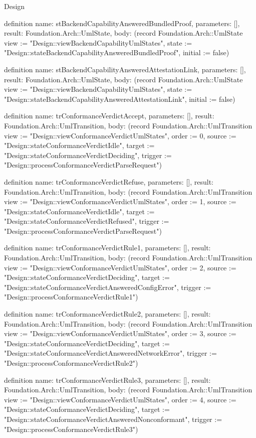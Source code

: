 \begin{lexlean}{Design}
\begin{semanticmodule}
definition{
  name: stBackendCapabilityAnsweredBundledProof,
  parameters: [],
  result: Foundation.Arch::UmlState,
  body: (record Foundation.Arch::UmlState {view := "Design::viewBackendCapabilityUmlStates", state := "Design::stateBackendCapabilityAnsweredBundledProof", initial := false})
}

definition{
  name: stBackendCapabilityAnsweredAttestationLink,
  parameters: [],
  result: Foundation.Arch::UmlState,
  body: (record Foundation.Arch::UmlState {view := "Design::viewBackendCapabilityUmlStates", state := "Design::stateBackendCapabilityAnsweredAttestationLink", initial := false})
}

definition{
  name: trConformanceVerdictAccept,
  parameters: [],
  result: Foundation.Arch::UmlTransition,
  body: (record Foundation.Arch::UmlTransition {view := "Design::viewConformanceVerdictUmlStates", order := 0, source := "Design::stateConformanceVerdictIdle", target := "Design::stateConformanceVerdictDeciding", trigger := "Design::processConformanceVerdictParseRequest"})
}

definition{
  name: trConformanceVerdictRefuse,
  parameters: [],
  result: Foundation.Arch::UmlTransition,
  body: (record Foundation.Arch::UmlTransition {view := "Design::viewConformanceVerdictUmlStates", order := 1, source := "Design::stateConformanceVerdictIdle", target := "Design::stateConformanceVerdictRefused", trigger := "Design::processConformanceVerdictParseRequest"})
}

definition{
  name: trConformanceVerdictRule1,
  parameters: [],
  result: Foundation.Arch::UmlTransition,
  body: (record Foundation.Arch::UmlTransition {view := "Design::viewConformanceVerdictUmlStates", order := 2, source := "Design::stateConformanceVerdictDeciding", target := "Design::stateConformanceVerdictAnsweredConfigError", trigger := "Design::processConformanceVerdictRule1"})
}

definition{
  name: trConformanceVerdictRule2,
  parameters: [],
  result: Foundation.Arch::UmlTransition,
  body: (record Foundation.Arch::UmlTransition {view := "Design::viewConformanceVerdictUmlStates", order := 3, source := "Design::stateConformanceVerdictDeciding", target := "Design::stateConformanceVerdictAnsweredNetworkError", trigger := "Design::processConformanceVerdictRule2"})
}

definition{
  name: trConformanceVerdictRule3,
  parameters: [],
  result: Foundation.Arch::UmlTransition,
  body: (record Foundation.Arch::UmlTransition {view := "Design::viewConformanceVerdictUmlStates", order := 4, source := "Design::stateConformanceVerdictDeciding", target := "Design::stateConformanceVerdictAnsweredNonconformant", trigger := "Design::processConformanceVerdictRule3"})
}


\end{semanticmodule}
\end{lexlean}
